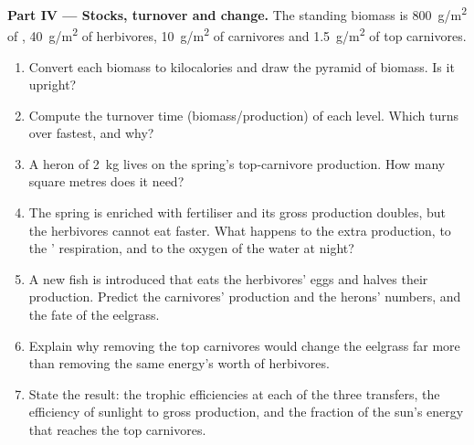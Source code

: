 \begin{problem}
\medskip
\noindent\textbf{Part IV --- Stocks, turnover and change.}
The standing biomass is \qty{800}{g/m^2} of , \qty{40}{g/m^2}
of herbivores, \qty{10}{g/m^2} of carnivores and \qty{1.5}{g/m^2} of top
carnivores.
\begin{enumerate}[resume]
  \item Convert each biomass to kilocalories and draw the pyramid of
        biomass. Is it upright?
  \item Compute the turnover time (biomass/production) of each level.
        Which turns over fastest, and why?
  \item A heron of \qty{2}{kg} lives on the spring's top-carnivore
        production. How many square metres does it need?
  \item The spring is enriched with fertiliser and its gross
        production doubles, but the herbivores cannot eat faster.
        What happens to the extra production, to the '
        respiration, and to the oxygen of the water at night?
  \item A new fish is introduced that eats the herbivores' eggs and
        halves their production. Predict the carnivores' production
        and the herons' numbers, and the fate of the eelgrass.
  \item Explain why removing the top carnivores would change the
        eelgrass far more than removing the same energy's worth of
        herbivores.
  \item State the result: the trophic efficiencies at each of the
        three transfers, the efficiency of sunlight to gross
        production, and the fraction of the sun's energy that reaches
        the top carnivores.
\end{enumerate}
\end{problem}
